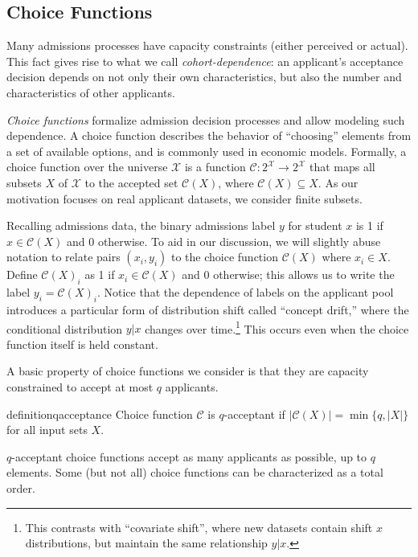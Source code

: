 \documentclass[letterpaper]{article}
\newcommand{\calX}{\mathcal{X}}
\newcommand{\choice}{\mathcal{C}}
\begin{document}
\subsection{Choice Functions}

Many admissions processes have capacity constraints (either perceived or actual). This fact gives rise to what we call \textit{cohort-dependence}: an applicant's acceptance decision depends on not only their own characteristics, but also the number and characteristics of other applicants.

\textit{Choice functions} formalize admission decision processes and allow modeling such dependence.
A choice function describes the behavior of ``choosing'' elements from a set of available options, and is commonly used in economic models. Formally, a choice function over the universe $\calX$ is a function $\choice: 2^\calX \to 2^\calX$ that maps all subsets $X$ of $\calX$ to the accepted set $\choice(X)$, where $\choice(X) \subseteq X$. As our motivation focuses on real applicant datasets, we consider finite subsets.

Recalling admissions data, the binary admissions label $y$ for student $x$ is 1 if $x \in \choice(X)$ and 0 otherwise.
To aid in our discussion, we will slightly abuse notation to relate pairs $(x_i,y_i)$ to the choice function $\mathcal C(X)$ where $x_i\in X$.
Define $\mathcal C(X)_i$ as 1 if $x_i\in \mathcal C(X)$ and 0 otherwise; this allows us to write the label $y_i=\mathcal C(X)_i$.
Notice that the dependence of labels on the applicant pool introduces a particular form of distribution shift called ``concept drift,'' where the conditional distribution $y | x$ changes over time.\footnote{This contrasts with ``covariate shift'', where new datasets contain shift $x$ distributions, but maintain the same relationship $y | x$.} This occurs even when the choice function itself is held constant.

A basic property of choice functions we consider is that they are capacity constrained to accept at most $q$ applicants.

\begin{restatable}[$q$-Acceptance]{definition}{qacceptance}
\label{def:q-acceptance}
Choice function $\choice$ is $q$-acceptant if $|\choice(X)| = \min\{q, |X|\}$ for all input sets $X$.
\end{restatable}
\noindent $q$-acceptant choice functions accept as many applicants as possible, up to $q$ elements.
Some (but not all) choice functions can be characterized as a total order.
\end{document}
